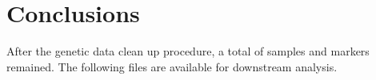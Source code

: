 \documentclass[10pt,twoside,english]{scrartcl}
\let\tempone\itemize
\let\temptwo\enditemize
\renewenvironment{itemize}{\tempone\setlength{\itemsep}{0pt}}{\temptwo}
\begin{document}
\section{Conclusions}
After the genetic data clean up procedure, a total of 
samples and  markers remained. The following files are
available for downstream analysis.

\begin{itemize}
\item {}
\end{itemize}

\begin{thebibliography}{9}
\end{thebibliography}
\end{document}

